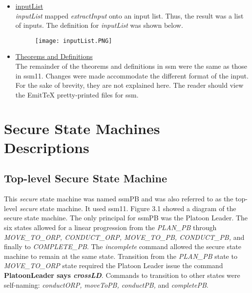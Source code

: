 \begin{itemize}
 \item \underline{inputList}\\
   \emph{inputList} mapped \emph{extractInput} onto an input list.  Thus, the result was a list of inputs.  The definition for \emph{inputList} was shown below.\\
   
  \begin{figure}[h!]
  \centering
  \texttt{[image: inputList.PNG]}
\end{figure}

 \item \underline{Theorems and Definitions}\\
 The remainder of the theorems and definitions in ssm were the same as those in ssm11.  Changes were made accommodate the different format of the input.  For the sake of brevity, they are not explained here.  The reader should view the EmitTeX pretty-printed files for ssm.
  \end{itemize}
 

  
\section{Secure State Machines Descriptions}
\label{sec:secure-state-mach}

\subsection{Top-level Secure State Machine}
\label{sec:top-level-secure}

This \emph{secure} state machine was named ssmPB and was also referred to as the top-level \emph{secure} state machine.  It used ssm11.  Figure 3.1 showed a diagram of the secure state machine.  The only principal for ssmPB was the Platoon Leader.   The six states allowed for a linear progression from the \emph{PLAN_PB} through \emph{MOVE_TO_ORP, CONDUCT_ORP, MOVE_TO_PB, CONDUCT_PB,} and finally to \emph{COMPLETE_PB}.  The \emph{incomplete} command allowed the secure state machine to remain at the same state.  Transition from the\emph{ PLAN_PB} state to \emph{MOVE_TO_ORP} state required the Platoon Leader issue the command \textbf{PlatoonLeader says \emph{crossLD}}.  Commands to transition to other states were self-naming: \emph{conductORP, moveToPB, conductPB,} and \emph{completePB}.\\\\\\\\

